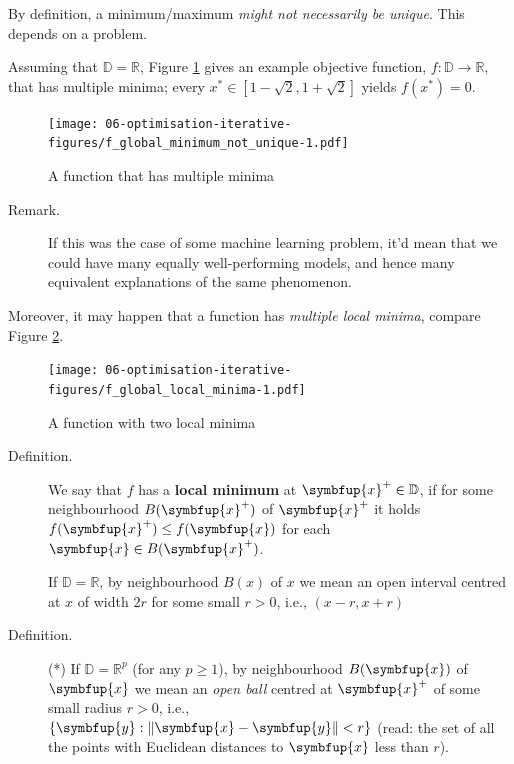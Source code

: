 \documentclass[10pt,b5paper,krantz1]{krantz}
\renewcommand{\mathbf}[1]{\symbfup{#1}}
\begin{document}
By definition, a minimum/maximum \emph{might not necessarily be unique}.
This depends on a problem.

Assuming that \(\mathbb{D}=\mathbb{R}\), Figure \ref{fig:f_global_minimum_not_unique}
gives an example objective function, \(f:\mathbb{D}\to\mathbb{R}\),
that has multiple minima; every \({x}^*\in[1-\sqrt{2},1+\sqrt{2}]\)
yields \(f(x^*)=0\).

\begin{figure}
\hypertarget{fig:f_global_minimum_not_unique}{%
\centering
\texttt{[image: 06-optimisation-iterative-figures/f\_global\_minimum\_not\_unique-1.pdf]}
\caption{A function that has multiple minima}\label{fig:f_global_minimum_not_unique}
}
\end{figure}

\begin{description}
\item[Remark.]
If this was the case of some machine learning problem, it'd mean
that we could have many equally well-performing models,
and hence many equivalent explanations of the same phenomenon.
\end{description}

Moreover, it may happen that a function has \emph{multiple local minima},
compare Figure \ref{fig:f_global_local_minima}.

\begin{figure}
\hypertarget{fig:f_global_local_minima}{%
\centering
\texttt{[image: 06-optimisation-iterative-figures/f\_global\_local\_minima-1.pdf]}
\caption{A function with two local minima}\label{fig:f_global_local_minima}
}
\end{figure}

\begin{description}
\item[Definition.]
We say that \(f\) has a \textbf{local minimum}
at \(\mathbf{x}^+\in \mathbb{D}\),
if for some neighbourhood \(B(\mathbf{x}^+)\) of \(\mathbf{x}^+\)
it holds \(f(\mathbf{x}^+) \le f(\mathbf{x})\) for each
\(\mathbf{x}\in B(\mathbf{x}^+)\).

If \(\mathbb{D}=\mathbb{R}\), by neighbourhood \(B(x)\) of \(x\)
we mean an open interval centred at \(x\) of width \(2r\)
for some small \(r>0\), i.e., \((x-r, x+r)\)
\item[Definition.]
(*) If \(\mathbb{D}=\mathbb{R}^p\) (for any \(p\ge 1\)), by neighbourhood \(B(\mathbf{x})\) of \(\mathbf{x}\)
we mean an \emph{open ball} centred at \(\mathbf{x}^+\) of some small radius \(r>0\),
i.e., \(\{\mathbf{y}: \|\mathbf{x}-\mathbf{y}\|<r\}\)
(read: the set of all the points with Euclidean distances
to \(\mathbf{x}\) less than \(r\)).
\end{description}
\end{document}
